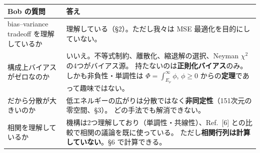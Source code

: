 \documentclass[11pt,a4paper]{ltjsarticle}
\newcommand{\Ev}{E_\nu}
\begin{document}
\begin{center}
\begin{tabular}{p{}p{}}
\toprule
\textbf{Bob の質問} & \textbf{答え} \\
\midrule
bias--variance tradeoff を理解しているか &
理解している（\S2）。ただし我々は MSE 最適化を目的にしていない。 \\[2pt]
構成上バイアスがゼロなのか &
いいえ。不等式制約、離散化、縮退解の選択、Neyman $\chi^2$ の4つがバイアス源。
持たないのは\textbf{正則化バイアス}のみ。しかも非負性・単調性は
$\Phi=\int_{\Ev}^{\infty}\phi$, $\phi\ge0$ からの\textbf{定理}であって趣味ではない。 \\[2pt]
だから分散が大きいのか &
低エネルギーの広がりは分散ではなく\textbf{非同定性}（151次元の零空間、\S3）。
どの手法でも解消できない。 \\[2pt]
相関を理解しているか &
機構は2つ理解しており（単調性・共線性）、Ref.~[6] との比較で相関の議論を既に使っている。
ただし\textbf{相関行列は計算していない}。\S6 で計算できる。 \\
\bottomrule
\end{tabular}
\end{center}
\end{document}
